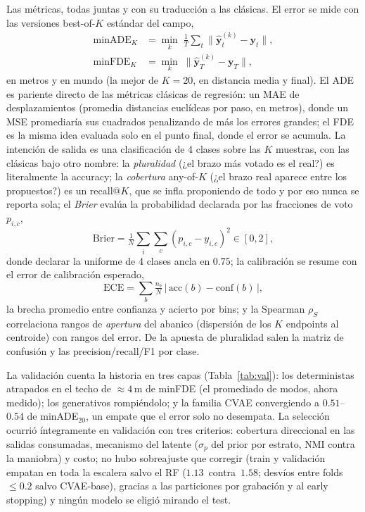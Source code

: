 \documentclass[conference,a4paper]{IEEEtran}
\begin{document}
Las métricas, todas juntas y con su traducción a las clásicas. El error se
mide con las versiones best-of-$K$ estándar del campo,
\begin{equation}
\begin{aligned}
\mathrm{minADE}_K &= \min_{k}\; \tfrac{1}{T} \textstyle\sum_{t}
\big\|\hat{\mathbf{y}}^{(k)}_t - \mathbf{y}_t\big\|,\\[1pt]
\mathrm{minFDE}_K &= \min_{k}\; \big\|\hat{\mathbf{y}}^{(k)}_T -
\mathbf{y}_T\big\|,
\end{aligned}
\end{equation}
en metros y en mundo (la mejor de $K=20$, en distancia media y final). El ADE
es pariente directo de las métricas clásicas de regresión: un MAE de
desplazamientos (promedia distancias euclídeas por paso, en metros), donde
un MSE promediaría sus cuadrados penalizando de más los errores grandes;
el FDE es la misma idea evaluada solo en el punto final, donde el error se
acumula. La intención de
salida es una clasificación de 4 clases sobre las $K$ muestras, con las
clásicas bajo otro nombre: la \emph{pluralidad} (¿el brazo más votado es el
real?) es literalmente la accuracy; la \emph{cobertura} any-of-$K$ (¿el
brazo real aparece entre los propuestos?) es un recall@$K$, que se infla
proponiendo de todo y por eso nunca se reporta sola; el \emph{Brier} evalúa
la probabilidad declarada por las fracciones de voto $p_{i,c}$,
\begin{equation}
\mathrm{Brier} = \tfrac{1}{N} \textstyle\sum_{i} \sum_{c}
\left(p_{i,c} - y_{i,c}\right)^2 \in [0, 2],
\end{equation}
donde declarar la uniforme de 4 clases ancla en $0.75$; la calibración se
resume con el error de calibración esperado,
\begin{equation}
\mathrm{ECE} = \textstyle\sum_{b} \tfrac{n_b}{N}\,
\left|\,\mathrm{acc}(b) - \mathrm{conf}(b)\,\right|,
\end{equation}
la brecha promedio entre confianza y acierto por bins; y la Spearman
$\rho_S$ correlaciona rangos de \emph{apertura} del abanico (dispersión de
los $K$ endpoints al centroide) con rangos del error. De la apuesta de
pluralidad salen la matriz de confusión y las precision/recall/F1 por
clase.

La validación cuenta la historia en tres capas (Tabla~\ref{tab:val}): los
deterministas atrapados en el techo de ${\approx}4$\,m de minFDE (el
promediado de modos, ahora medido); los generativos rompiéndolo; y la
familia CVAE convergiendo a $0.51$--$0.54$ de minADE$_{20}$, un empate que
el error solo no desempata. La selección ocurrió íntegramente en validación
con tres criterios: cobertura direccional en las salidas consumadas,
mecanismo del latente ($\sigma_p$ del prior por estrato, NMI contra la
maniobra) y costo; no hubo sobreajuste que corregir (train y validación
empatan en toda la escalera salvo el RF ($1.13$~contra~$1.58$; desvíos entre folds $\leq 0.2$ salvo CVAE-base), gracias a
las particiones por grabación y al early stopping) y ningún modelo se
eligió mirando el test.
\end{document}

